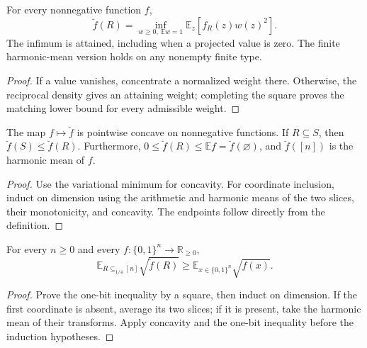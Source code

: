 \begin{theorem}
  \label{thm:analysis-harmonic-variational}
  \leanok
  For every nonnegative function $f$,
  \[
    \breve f(R)=\inf_{w\ge0,\ \mathbb{E}w=1}
      \mathbb{E}_z[f_R(z)w(z)^2].
  \]
  The infimum is attained, including when a projected value is zero.
  The finite harmonic-mean version holds on any nonempty finite type.
\end{theorem}
\begin{proof}
  \leanok
  If a value vanishes, concentrate a normalized weight there. Otherwise,
  the reciprocal density gives an attaining weight; completing the square
  proves the matching lower bound for every admissible weight.
\end{proof}

\begin{corollary}
  \label{cor:analysis-harmonic-properties}
  \leanok
  The map $f\mapsto\breve f$ is pointwise concave on nonnegative functions.
  If $R\subseteq S$, then $\breve f(S)\le\breve f(R)$. Furthermore,
  $0\le\breve f(R)\le\mathbb{E}f=\breve f(\varnothing)$, and
  $\breve f([n])$ is the harmonic mean of $f$.
\end{corollary}
\begin{proof}
  \leanok
  Use the variational minimum for concavity. For coordinate inclusion,
  induct on dimension using the arithmetic and harmonic means of the two
  slices, their monotonicity, and concavity. The endpoints follow directly
  from the definition.
\end{proof}

\begin{theorem}
  \label{thm:analysis-harmonic-inequality}
  \leanok
  For every $n\ge0$ and every $f:\{0,1\}^n\to\mathbb{R}_{\ge0}$,
  \[
    \mathbb{E}_{R\subseteq_{1/4}[n]}\sqrt{\breve f(R)}
      \ge \mathbb{E}_{x\in\{0,1\}^n}\sqrt{f(x)}.
  \]
\end{theorem}
\begin{proof}
  \leanok
  Prove the one-bit inequality by a square, then induct on dimension.
  If the first coordinate is absent, average its two slices; if it is
  present, take the harmonic mean of their transforms. Apply concavity
  and the one-bit inequality before the induction hypotheses.
\end{proof}

